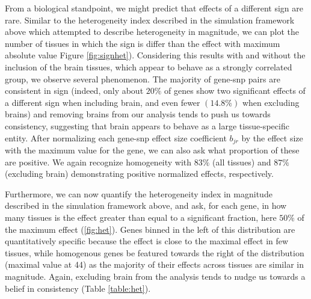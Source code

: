 From a biological standpoint, we might predict that effects of a different sign are rare. Similar to the heterogeneity index described in the simulation framework above which attempted to describe heterogeneity in magnitude, we can plot the number of tissues in which the sign is differ than the effect with maximum absolute value Figure \ref{fig:signhet}). Considering this results with and without the inclusion of the brain tissues, which appear to behave as a strongly correlated group, we observe several phenomenon. The majority of gene-snp pairs are consistent in sign (indeed, only about $20\%$ of genes show two significant effects of a different sign when including brain, and even fewer $(14.8\%)$ when excluding brains) and removing brains from our analysis tends to push us towards consistency, suggesting that brain appears to behave as a large tissue-specific entity. After normalizing each gene-snp effect size coefficient $b_{jr}$ by the effect size with the maximum value for the gene, we can also ask what proportion of these are positive. We again recognize homogeneity with $83\%$ (all tissues) and $87\%$  (excluding brain) demonstrating positive normalized effects, respectively. \newline



Furthermore, we can now quantify the heterogeneity index in magnitude described in the simulation framework above, and ask, for each gene, in how many tissues is the effect greater than equal to a significant fraction, here $50\%$ of the maximum effect (\ref{fig:het}). Genes binned in the left of this distribution are quantitatively specific because the effect is close to the maximal effect in few tissues, while homogenous genes be featured towards the right of the distribution (maximal value at 44) as the majority of their effects across tissues are similar in magnitude. Again, excluding brain from the analysis tends to nudge us towards a belief in consistency (Table \ref{table:het}).

